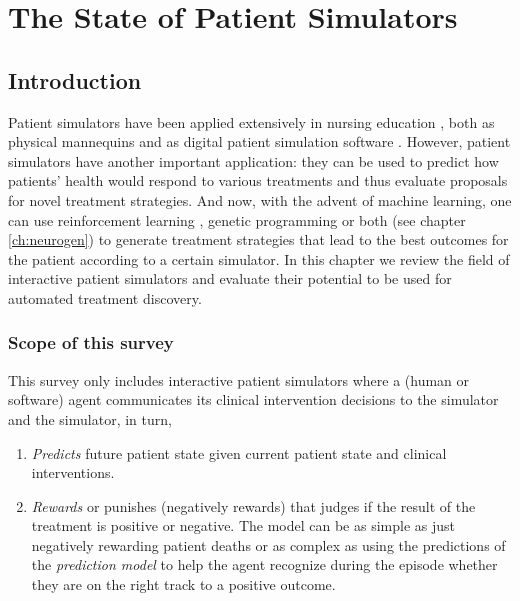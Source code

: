\chapter{The State of Patient Simulators}
\label{ch:simulators-sota}

\section{Introduction}
\label{sec:intro}

Patient simulators have been applied extensively in nursing education \cite{didactic-sims1,didactic-sims2,didactic-sims3}, both as physical mannequins and as digital patient simulation software \cite{didactic-virtual}.
However, patient simulators have another important application: they can be used to predict how patients' health would respond to various treatments and thus evaluate proposals for novel treatment strategies.
And now, with the advent of machine learning, one can use reinforcement learning \cite{healthcare-rl}, genetic programming or both (see chapter \ref{ch:neurogen}) to generate treatment strategies that lead to the best outcomes for the patient according to a certain simulator.
In this chapter we review the field of interactive patient simulators and evaluate their potential to be used for automated treatment discovery.

\subsection{Scope of this survey}
\label{sec:scope}

This survey only includes interactive patient simulators where a (human or software) agent communicates its clinical intervention decisions to the simulator and the simulator, in turn,
\begin{enumerate}
    \item \emph{Predicts} future patient state given current patient state and clinical interventions.
    \item \emph{Rewards} or punishes (negatively rewards) that judges if the result of the treatment is positive or negative. The model can be as simple as just negatively rewarding patient deaths or as complex as using the predictions of the \emph{prediction model} to help the agent recognize during the episode whether they are on the right track to a positive outcome.
\end{enumerate}

